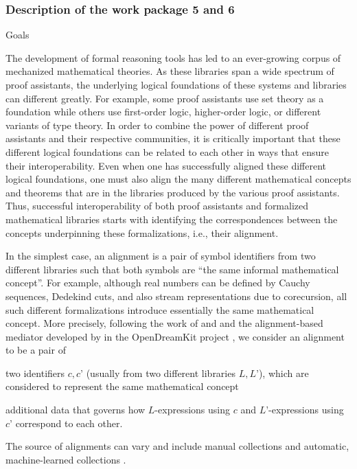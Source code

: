 \subsubsection{Description of the work package 5 and 6}

{\color{red} Goals}

The development of formal reasoning tools has led to an ever-growing
corpus of mechanized mathematical theories. As these libraries span a
wide spectrum of proof assistants, the underlying logical foundations
of these systems and libraries can different greatly. For example,
some proof assistants use set theory as a foundation while others use
first-order logic, higher-order logic, or different variants of type
theory.  In order to combine the power of different proof assistants
and their respective communities, it is critically important that
these different logical foundations can be related to each other in
ways that ensure their interoperability.  Even when one has
successfully aligned these different logical foundations, one must
also align the many different mathematical concepts and theorems that
are in the libraries produced by the various proof assistants. Thus,
successful interoperability of both proof assistants and formalized
mathematical libraries starts with identifying the correspondences
between the concepts underpinning these formalizations, i.e., their
alignment.

In the simplest case, an alignment is a pair of symbol identifiers
from two different libraries such that both symbols are ``the same
informal mathematical concept''. For example, although real numbers
can be defined by Cauchy sequences, Dedekind cuts, and also stream
representations due to corecursion, all such different formalizations
introduce essentially the same mathematical concept. More precisely,
following the work of  and 
\cite{GKKMR:alignments:17} and the alignment-based mediator developed
by  in the OpenDreamKit project \cite{ODK:mitm:18}, we
consider an alignment to be a pair of
\begin{compactitem}
  \item two identifiers $c,c’$ (usually from two different libraries
    $L,L’$), which are considered to represent the same mathematical
    concept
  \item additional data that governs how $L$-expressions using $c$ and
    $L’$-expressions using $c’$ correspond to each other.
\end{compactitem}
The source of alignments can vary and include manual collections
\cite{MRLR:alignments:17} and automatic, machine-learned collections
\cite{align_kaliszyk}.

